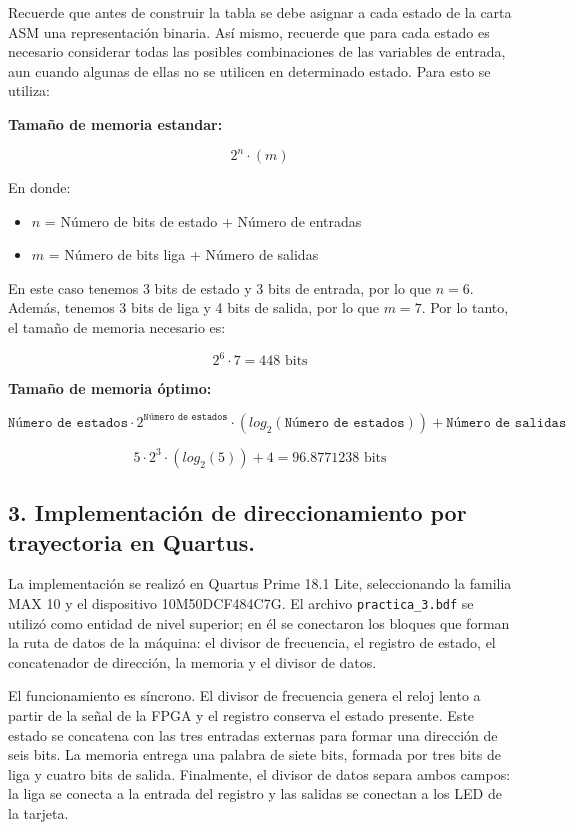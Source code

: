 \documentclass[12pt, letterpaper]{article}
\begin{document}
Recuerde que antes de construir la tabla se debe asignar a cada estado de la carta ASM una representación binaria. Así mismo, recuerde que para cada estado es necesario considerar todas las posibles combinaciones de las variables de entrada, aun cuando algunas de ellas no se utilicen en determinado estado. Para esto se utiliza:

\textbf{Tamaño de memoria estandar:}

\[2^n \cdot (m)\]

En donde:
\begin{itemize}
    \item $n$ = Número de bits de estado + Número de entradas
    \item $m$ = Número de bits liga + Número de salidas
\end{itemize}

En este caso tenemos 3 bits de estado y 3 bits de entrada, por lo que $n = 6$. Además, tenemos 3 bits de liga y 4 bits de salida, por lo que $m = 7$. Por lo tanto, el tamaño de memoria necesario es:

\begin{tcolorbox}[colback=gray!20,colframe=LimeGreen!75!black]
\[2^6 \cdot 7 = 448 \text{ bits}\]
\end{tcolorbox}

\textbf{Tamaño de memoria óptimo:}

\[\texttt{Número de estados} \cdot 2^{\texttt{Número de estados}} \cdot (log_2(\texttt{Número de estados})) + \texttt{Número de salidas}\]

\begin{tcolorbox}[colback=gray!20,colframe=LimeGreen!75!black]
\[5\cdot 2^3 \cdot (log_2(5)) + 4 = 96.8771238 \text{ bits}\]
\end{tcolorbox}

\subsection*{3. Implementación de direccionamiento por trayectoria en Quartus.}

La implementación se realizó en Quartus Prime 18.1 Lite, seleccionando la familia MAX 10 y el dispositivo 10M50DCF484C7G. El archivo \texttt{practica\_3.bdf} se utilizó como entidad de nivel superior; en él se conectaron los bloques que forman la ruta de datos de la máquina: el divisor de frecuencia, el registro de estado, el concatenador de dirección, la memoria y el divisor de datos.

El funcionamiento es síncrono. El divisor de frecuencia genera el reloj lento a partir de la señal de la FPGA y el registro conserva el estado presente. Este estado se concatena con las tres entradas externas para formar una dirección de seis bits. La memoria entrega una palabra de siete bits, formada por tres bits de liga y cuatro bits de salida. Finalmente, el divisor de datos separa ambos campos: la liga se conecta a la entrada del registro y las salidas se conectan a los LED de la tarjeta.
\end{document}
